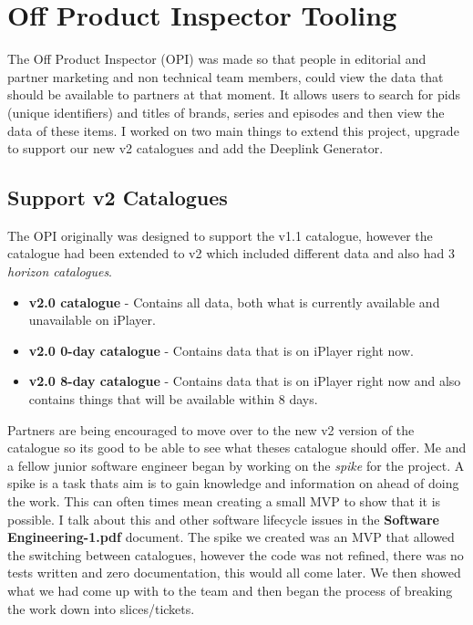 \section{Off Product Inspector Tooling}

  The Off Product Inspector (OPI) was made so that people in editorial and partner marketing and non technical team members, could view the data that
  should be available to partners at that moment. It allows users to search for pids (unique identifiers) and titles of brands, series and episodes
  and then view the data of these items. I worked on two main things to extend this project, upgrade to support our new v2 catalogues and add the 
  Deeplink Generator.

  \subsection{Support v2 Catalogues}
  The OPI originally was designed to support the v1.1 catalogue, however the catalogue had been extended to v2 which included different data and also 
  had 3 \textit{horizon catalogues}.
  \begin{itemize}
    \item \textbf{v2.0 catalogue} - Contains all data, both what is currently available and unavailable on iPlayer.
    \item \textbf{v2.0 0-day catalogue} - Contains data that is on iPlayer right now.
    \item \textbf{v2.0 8-day catalogue} - Contains data that is on iPlayer right now and also contains things that will be available within 8 days.
  \end{itemize}

  Partners are being encouraged to move over to the new v2 version of the catalogue so its good to be able to see what theses catalogue should offer.
  Me and a fellow junior software engineer began by working on the \textit{spike} for the project. A spike is a task thats aim is to gain knowledge
  and information on ahead of doing the work. This can often times mean creating a small MVP to show that it is possible. I talk about this and other
  software lifecycle issues in the \textbf{Software Engineering-1.pdf} document. The spike we created was an MVP that allowed the switching between 
  catalogues, however the code was not refined, there was no tests written and zero documentation, this would all come later. We then showed what we 
  had come up with to the team and then began the process of breaking the work down into slices/tickets.

